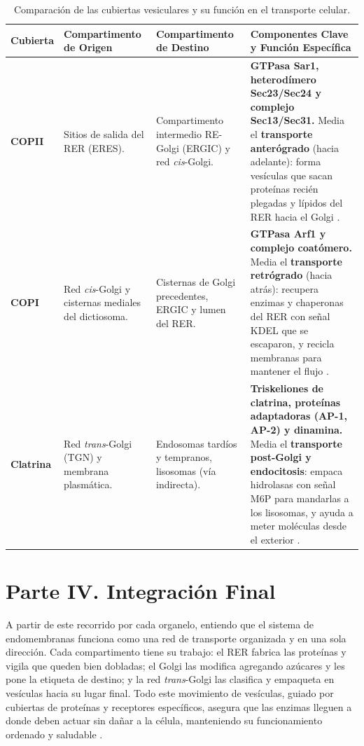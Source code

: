 \documentclass[12pt,spanish,letterpaper,oneside]{article}
\begin{document}
\begin{table}[htbp]
\centering
\scriptsize
\setlength{\tabcolsep}{4.5pt}
\renewcommand{\arraystretch}{1.08}
\begin{tabularx}{\textwidth}{p{1.6cm}p{2.8cm}p{2.8cm}Z}
\toprule
\textbf{Cubierta} & \textbf{Compartimento de Origen} & \textbf{Compartimento de Destino} & \textbf{Componentes Clave y Función Específica} \\
\midrule
\textbf{COPII} & Sitios de salida del RER (ERES). & Compartimento intermedio RE-Golgi (ERGIC) y red \textit{cis}-Golgi. & 
\textbf{GTPasa Sar1, heterodímero Sec23/Sec24 y complejo Sec13/Sec31.} Media el \textbf{transporte anterógrado} (hacia adelante): forma vesículas que sacan proteínas recién plegadas y lípidos del RER hacia el Golgi \parencite{alberts2022molecular, fortoul2020histologia}. \\
\addlinespace[0.15cm]
\textbf{COPI} & Red \textit{cis}-Golgi y cisternas mediales del dictiosoma. & Cisternas de Golgi precedentes, ERGIC y lumen del RER. & 
\textbf{GTPasa Arf1 y complejo coatómero.} Media el \textbf{transporte retrógrado} (hacia atrás): recupera enzimas y chaperonas del RER con señal KDEL que se escaparon, y recicla membranas para mantener el flujo \parencite{lodish2021molecular, fortoul2020histologia}. \\
\addlinespace[0.15cm]
\textbf{Clatrina} & Red \textit{trans}-Golgi (TGN) y membrana plasmática. & Endosomas tardíos y tempranos, lisosomas (vía indirecta). & 
\textbf{Triskeliones de clatrina, proteínas adaptadoras (AP-1, AP-2) y dinamina.} Media el \textbf{transporte post-Golgi y endocitosis}: empaca hidrolasas con señal M6P para mandarlas a los lisosomas, y ayuda a meter moléculas desde el exterior \parencite{mathews2013bioquimica, kierszenbaum2020histologia}. \\
\bottomrule
\end{tabularx}
\caption{Comparación de las cubiertas vesiculares y su función en el transporte celular.}
\label{tab:cubiertas_vesiculares}
\end{table}

\clearpage

\section{Parte IV. Integración Final}
A partir de este recorrido por cada organelo, entiendo que el sistema de endomembranas funciona como una red de transporte organizada y en una sola dirección. Cada compartimento tiene su trabajo: el RER fabrica las proteínas y vigila que queden bien dobladas; el Golgi las modifica agregando azúcares y les pone la etiqueta de destino; y la red \textit{trans}-Golgi las clasifica y empaqueta en vesículas hacia su lugar final. Todo este movimiento de vesículas, guiado por cubiertas de proteínas y receptores específicos, asegura que las enzimas lleguen a donde deben actuar sin dañar a la célula, manteniendo su funcionamiento ordenado y saludable \parencite{alberts2022molecular, lodish2021molecular, fortoul2020histologia}.
\end{document}
